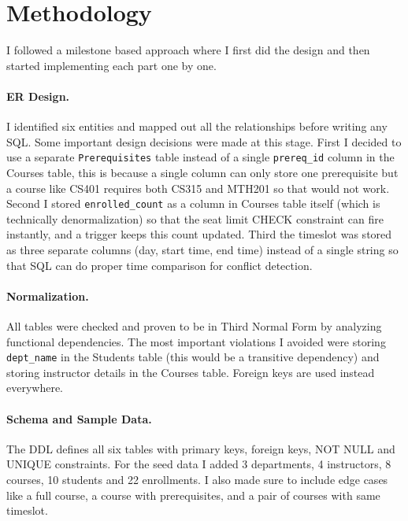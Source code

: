 \documentclass[11pt]{article}
\begin{document}
    \section{Methodology}

    I followed a milestone based approach where I first did the design and then
    started implementing each part one by one.

    \paragraph{ER Design.}
    I identified six entities and mapped out all the relationships before writing
    any SQL. Some important design decisions were made at this stage. First I decided
    to use a separate \texttt{Prerequisites} table instead of a single \texttt{prereq\_id}
    column in the Courses table, this is because a single column can only store one
    prerequisite but a course like CS401 requires both CS315 and MTH201 so that would
    not work. Second I stored \texttt{enrolled\_count} as a column in Courses table
    itself (which is technically denormalization) so that the seat limit CHECK constraint
    can fire instantly, and a trigger keeps this count updated. Third the timeslot was
    stored as three separate columns (day, start time, end time) instead of a single
    string so that SQL can do proper time comparison for conflict detection.

    \paragraph{Normalization.}
    All tables were checked and proven to be in Third Normal Form by analyzing functional
    dependencies. The most important violations I avoided were storing \texttt{dept\_name}
    in the Students table (this would be a transitive dependency) and storing instructor
    details in the Courses table. Foreign keys are used instead everywhere.

    \paragraph{Schema and Sample Data.}
    The DDL defines all six tables with primary keys, foreign keys, NOT NULL and UNIQUE
    constraints. For the seed data I added 3 departments, 4 instructors, 8 courses,
    10 students and 22 enrollments. I also made sure to include edge cases like a full
    course, a course with prerequisites, and a pair of courses with same timeslot.
\end{document}
